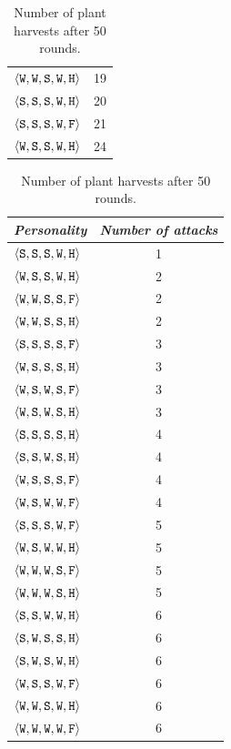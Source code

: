 \begin{table}
{{\begin{minipage}[b]{0.42\hsize}
\begin{tabular}{ l | c }
					$\personality{W}{W}{S}{W}{H}$ & 19\\
					$\personality{S}{S}{S}{W}{H}$ & 20\\
					$\personality{S}{S}{S}{W}{F}$ & 21\\
					$\personality{W}{S}{S}{W}{H}$ & 24\\
				\end{tabular}
				\caption{Number of plant harvests after 50 rounds.}
				\label{tab:numHarvests}
			\end{minipage}
			\hfill
			\begin{minipage}[b]{0.42\hsize}\centering
				\begin{tabular}{ l | c }
					\emph{Personality} & \emph{Number of attacks} \\
					\hline
						$\personality{S}{S}{S}{W}{H}$ & 1\\
						$\personality{W}{S}{S}{W}{H}$ & 2\\
						$\personality{W}{W}{S}{S}{F}$ & 2\\
						$\personality{W}{W}{S}{S}{H}$ & 2\\
						$\personality{S}{S}{S}{S}{F}$ & 3\\
						$\personality{W}{S}{S}{S}{H}$ & 3\\
						$\personality{W}{S}{W}{S}{F}$ & 3\\
						$\personality{W}{S}{W}{S}{H}$ & 3\\
						$\personality{S}{S}{S}{S}{H}$ & 4\\
						$\personality{S}{S}{W}{S}{H}$ & 4\\
						$\personality{W}{S}{S}{S}{F}$ & 4\\
						$\personality{W}{S}{W}{W}{F}$ & 4\\
						$\personality{S}{S}{S}{W}{F}$ & 5\\
						$\personality{W}{S}{W}{W}{H}$ & 5\\
						$\personality{W}{W}{W}{S}{F}$ & 5\\
						$\personality{W}{W}{W}{S}{H}$ & 5\\
						$\personality{S}{S}{W}{W}{H}$ & 6\\
						$\personality{S}{W}{S}{S}{H}$ & 6\\
						$\personality{S}{W}{S}{W}{H}$ & 6\\
						$\personality{W}{S}{S}{W}{F}$ & 6\\
						$\personality{W}{W}{S}{W}{H}$ & 6\\
						$\personality{W}{W}{W}{W}{F}$ & 6\\

\end{tabular}
\end{minipage}}}
\end{table}
